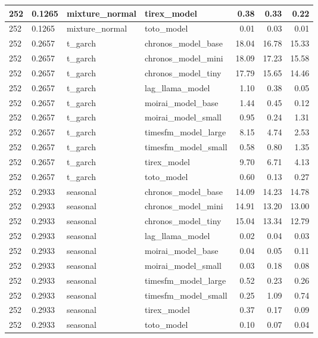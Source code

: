 {\begin{tabular}{llllrrr}
\midrule
252 & 0.1265 & mixture\_normal & tirex\_model & 0.38 & 0.33 & 0.22 \\
\midrule
252 & 0.1265 & mixture\_normal & toto\_model & 0.01 & 0.03 & 0.01 \\
\midrule
252 & 0.2657 & t\_garch & chronos\_model\_base & 18.04 & 16.78 & 15.33 \\
\midrule
252 & 0.2657 & t\_garch & chronos\_model\_mini & 18.09 & 17.23 & 15.58 \\
\midrule
252 & 0.2657 & t\_garch & chronos\_model\_tiny & 17.79 & 15.65 & 14.46 \\
\midrule
252 & 0.2657 & t\_garch & lag\_llama\_model & 1.10 & 0.38 & 0.05 \\
\midrule
252 & 0.2657 & t\_garch & moirai\_model\_base & 1.44 & 0.45 & 0.12 \\
\midrule
252 & 0.2657 & t\_garch & moirai\_model\_small & 0.95 & 0.24 & 1.31 \\
\midrule
252 & 0.2657 & t\_garch & timesfm\_model\_large & 8.15 & 4.74 & 2.53 \\
\midrule
252 & 0.2657 & t\_garch & timesfm\_model\_small & 0.58 & 0.80 & 1.35 \\
\midrule
252 & 0.2657 & t\_garch & tirex\_model & 9.70 & 6.71 & 4.13 \\
\midrule
252 & 0.2657 & t\_garch & toto\_model & 0.60 & 0.13 & 0.27 \\
\midrule
252 & 0.2933 & seasonal & chronos\_model\_base & 14.09 & 14.23 & 14.78 \\
\midrule
252 & 0.2933 & seasonal & chronos\_model\_mini & 14.91 & 13.20 & 13.00 \\
\midrule
252 & 0.2933 & seasonal & chronos\_model\_tiny & 15.04 & 13.34 & 12.79 \\
\midrule
252 & 0.2933 & seasonal & lag\_llama\_model & 0.02 & 0.04 & 0.03 \\
\midrule
252 & 0.2933 & seasonal & moirai\_model\_base & 0.04 & 0.05 & 0.11 \\
\midrule
252 & 0.2933 & seasonal & moirai\_model\_small & 0.03 & 0.18 & 0.08 \\
\midrule
252 & 0.2933 & seasonal & timesfm\_model\_large & 0.52 & 0.23 & 0.26 \\
\midrule
252 & 0.2933 & seasonal & timesfm\_model\_small & 0.25 & 1.09 & 0.74 \\
\midrule
252 & 0.2933 & seasonal & tirex\_model & 0.37 & 0.17 & 0.09 \\
\midrule
252 & 0.2933 & seasonal & toto\_model & 0.10 & 0.07 & 0.04 \\

\end{tabular}}
